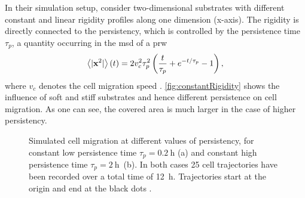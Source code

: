 In their simulation setup, \citeauthor{novikova:2017} consider two-dimensional substrates with different constant and linear rigidity profiles along one dimension (x-axis). The rigidity is directly connected to the persistency, which is controlled by the persistence time $\tau_p$, a quantity occurring in the \ac{msd} of a \ac{prw}
\begin{equation*}
 \avg{|\bv{x}^2|}(t) = 2 v_c^2 \tau_p^2 \left(\frac{t}{\tau_p} + e^{-t/\tau_p} - 1\right),
\end{equation*}
where $v_c$ denotes the cell migration speed \cite{novikova:2017}. \autoref{fig:constantRigidity} shows the influence of soft and stiff substrates and hence different persistence on cell migration. As one can see, the covered area is much larger in the case of higher persistency.

\begin{figure}[bth]
    \myfloatalign
     \quad
    \caption[]{Simulated cell migration at different values of persistency, for constant low persistence time $\tau_p = \SI{0.2}{\hour}$ (a) and constant high persistence  time \mbox{$\tau_p = \SI{2}{\hour}$ (b).} In both cases 25 cell trajectories have been recorded over a total time of \SI{12}{\hour}. Trajectories start at the origin and end at the black dots \cite{novikova:2017}.}\label{fig:constantRigidity}
\end{figure}

